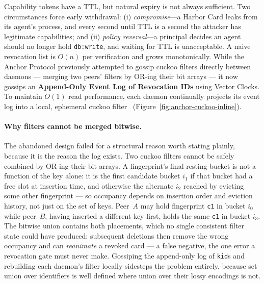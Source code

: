 \documentclass[11pt,a4paper]{article}
\theoremstyle{definition}
\begin{document}
Capability tokens have a TTL, but natural expiry is not always sufficient. Two circumstances force early withdrawal: (i) \emph{compromise}---a Harbor Card leaks from its agent's process, and every second until TTL is a second the attacker has legitimate capabilities; and (ii) \emph{policy reversal}---a principal decides an agent should no longer hold \texttt{db:write}, and waiting for TTL is unacceptable. A naive revocation list is $O(n)$ per verification and grows monotonically. While the Anchor Protocol previously attempted to gossip cuckoo filters directly between daemons --- merging two peers' filters by OR-ing their bit arrays --- it now gossips an \textbf{Append-Only Event Log of Revocation IDs} using Vector Clocks. To maintain $O(1)$ read performance, each daemon continually projects its event log into a local, ephemeral cuckoo filter~\cite{fan2014cuckoo} (Figure~\ref{fig:anchor-cuckoo-inline}).

\paragraph{Why filters cannot be merged bitwise.} The abandoned design failed for a structural reason worth stating plainly, because it is the reason the log exists. Two cuckoo filters cannot be safely combined by OR-ing their bit arrays. A fingerprint's final resting bucket is not a function of the key alone: it is the first candidate bucket $i_1$ if that bucket had a free slot at insertion time, and otherwise the alternate $i_2$ reached by evicting some other fingerprint --- so occupancy depends on insertion order and eviction history, not just on the set of keys. Peer~$A$ may hold fingerprint \texttt{c1} in bucket $i_0$ while peer~$B$, having inserted a different key first, holds the same \texttt{c1} in bucket $i_3$. The bitwise union contains both placements, which no single consistent filter state could have produced: subsequent deletions then remove the wrong occupancy and can \emph{reanimate} a revoked card --- a false negative, the one error a revocation gate must never make. Gossiping the append-only log of \texttt{kid}s and rebuilding each daemon's filter locally sidesteps the problem entirely, because set union over identifiers is well defined where union over their lossy encodings is not.
\end{document}
